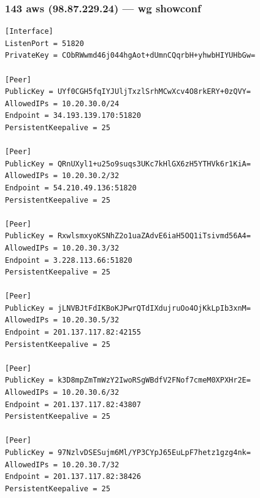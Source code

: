 \documentclass[11pt,a4paper]{article}
\begin{document}
\subsubsection*{143 aws (98.87.229.24) — wg showconf}
\begin{lstlisting}
[Interface]
ListenPort = 51820
PrivateKey = CObRWwmd46j044hgAot+dUmnCQqrbH+yhwbHIYUHbGw=

[Peer]
PublicKey = UYf0CGH5fqIYJUljTxzlSrhMCwXcv4O8rkERY+0zQVY=
AllowedIPs = 10.20.30.0/24
Endpoint = 34.193.139.170:51820
PersistentKeepalive = 25

[Peer]
PublicKey = QRnUXyl1+u25o9suqs3UKc7kHlGX6zH5YTHVk6r1KiA=
AllowedIPs = 10.20.30.2/32
Endpoint = 54.210.49.136:51820
PersistentKeepalive = 25

[Peer]
PublicKey = RxwlsmxyoKSNhZ2o1uaZAdvE6iaH5OQ1iTsivmd56A4=
AllowedIPs = 10.20.30.3/32
Endpoint = 3.228.113.66:51820
PersistentKeepalive = 25

[Peer]
PublicKey = jLNVBJtFdIKBoKJPwrQTdIXdujruOo4OjKkLpIb3xnM=
AllowedIPs = 10.20.30.5/32
Endpoint = 201.137.117.82:42155
PersistentKeepalive = 25

[Peer]
PublicKey = k3D8mpZmTmWzY2IwoRSgWBdfV2FNof7cmeM0XPXHr2E=
AllowedIPs = 10.20.30.6/32
Endpoint = 201.137.117.82:43807
PersistentKeepalive = 25

[Peer]
PublicKey = 97NzlvDSESujm6Ml/YP3CYpJ65EuLpF7hetz1gzg4nk=
AllowedIPs = 10.20.30.7/32
Endpoint = 201.137.117.82:38426
PersistentKeepalive = 25

\end{lstlisting}
\end{document}
